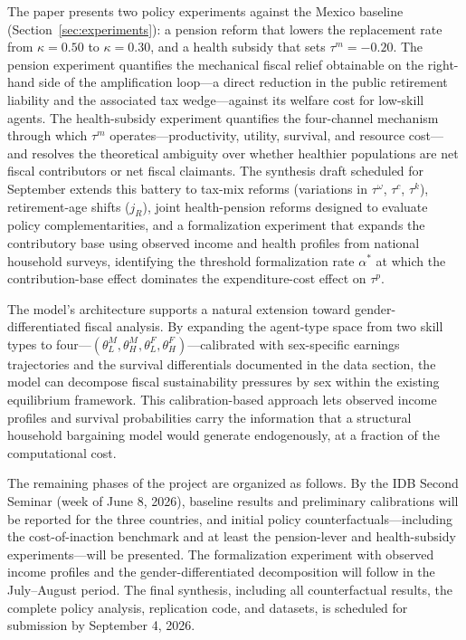 \documentclass[12pt,a4paper]{article}
\begin{document}
The paper presents two policy experiments against the Mexico baseline (Section~\ref{sec:experiments}): a pension reform that lowers the replacement rate from $\kappa = 0.50$ to $\kappa = 0.30$, and a health subsidy that sets $\tau^{m} = -0.20$. The pension experiment quantifies the mechanical fiscal relief obtainable on the right-hand side of the amplification loop---a direct reduction in the public retirement liability and the associated tax wedge---against its welfare cost for low-skill agents. The health-subsidy experiment quantifies the four-channel mechanism through which $\tau^{m}$ operates---productivity, utility, survival, and resource cost---and resolves the theoretical ambiguity over whether healthier populations are net fiscal contributors or net fiscal claimants. The synthesis draft scheduled for September extends this battery to tax-mix reforms (variations in $\tau^{\omega}$, $\tau^{c}$, $\tau^{k}$), retirement-age shifts ($j_{R}$), joint health-pension reforms designed to evaluate policy complementarities, and a formalization experiment that expands the contributory base using observed income and health profiles from national household surveys, identifying the threshold formalization rate $\alpha^{*}$ at which the contribution-base effect dominates the expenditure-cost effect on $\tau^{p}$.

The model's architecture supports a natural extension toward gender-differentiated fiscal analysis. By expanding the agent-type space from two skill types to four---$(\theta_L^M, \theta_H^M, \theta_L^F, \theta_H^F)$---calibrated with sex-specific earnings trajectories and the survival differentials documented in the data section, the model can decompose fiscal sustainability pressures by sex within the existing equilibrium framework. This calibration-based approach lets observed income profiles and survival probabilities carry the information that a structural household bargaining model would generate endogenously, at a fraction of the computational cost.

The remaining phases of the project are organized as follows. By the IDB Second Seminar (week of June 8, 2026), baseline results and preliminary calibrations will be reported for the three countries, and initial policy counterfactuals---including the cost-of-inaction benchmark and at least the pension-lever and health-subsidy experiments---will be presented. The formalization experiment with observed income profiles and the gender-differentiated decomposition will follow in the July--August period. The final synthesis, including all counterfactual results, the complete policy analysis, replication code, and datasets, is scheduled for submission by September 4, 2026.
\end{document}
